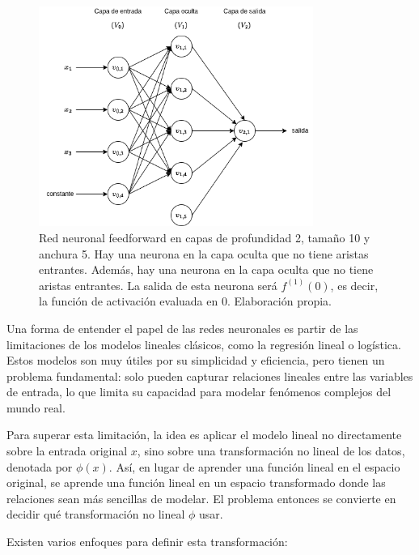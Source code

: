 \begin{figure}[!htbp]
    \centering
    \includegraphics[width=0.8\textwidth]{img/red_neuronal.png}
    \caption{Red neuronal feedforward en capas de profundidad 2, tamaño 10 y anchura 5. Hay una neurona en la capa oculta que no tiene aristas entrantes. Además, hay una neurona en la capa oculta que no tiene aristas entrantes. La salida de esta neurona será $f^{(1)}(0)$, es decir, la función de activación evaluada en $0$. Elaboración propia. }
    \label{fig:red-neuronal}
\end{figure}


Una forma de entender el papel de las redes neuronales es partir de las limitaciones de los modelos lineales clásicos, como la regresión lineal o logística. Estos modelos son muy útiles por su simplicidad y eficiencia, pero tienen un problema fundamental: solo pueden capturar relaciones lineales entre las variables de entrada, lo que limita su capacidad para modelar fenómenos complejos del mundo real.

Para superar esta limitación, la idea es aplicar el modelo lineal no directamente sobre la entrada original \(x\), sino sobre una transformación no lineal de los datos, denotada por \(\phi(x)\). Así, en lugar de aprender una función lineal en el espacio original, se aprende una función lineal en un espacio transformado donde las relaciones sean más sencillas de modelar. El problema entonces se convierte en decidir qué transformación no lineal \(\phi\) usar.

Existen varios enfoques para definir esta transformación:

